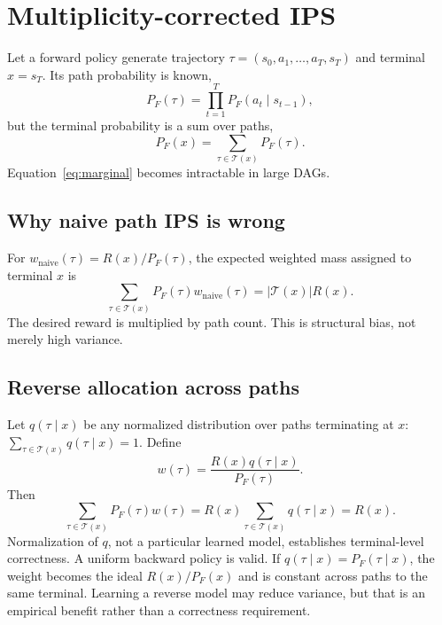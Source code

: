 \documentclass[11pt]{article}
\begin{document}
\section{Multiplicity-corrected IPS}

Let a forward policy generate trajectory
\(\tau=(s_0,a_1,\ldots,a_T,s_T)\) and terminal \(x=s_T\). Its path
probability is known,
\begin{equation}
 P_F(\tau)=\prod_{t=1}^{T}P_F(a_t\mid s_{t-1}),
\end{equation}
but the terminal probability is a sum over paths,
\begin{equation}
 P_F(x)=\sum_{\tau\in\mathcal T(x)}P_F(\tau).
 \label{eq:marginal}
\end{equation}
Equation~\eqref{eq:marginal} becomes intractable in large DAGs.

\subsection{Why naive path IPS is wrong}

For \(w_{\mathrm{naive}}(\tau)=R(x)/P_F(\tau)\), the expected weighted mass
assigned to terminal \(x\) is
\begin{equation}
 \sum_{\tau\in\mathcal T(x)}P_F(\tau)w_{\mathrm{naive}}(\tau)
 =|\mathcal T(x)|R(x).
\end{equation}
The desired reward is multiplied by path count. This is structural bias, not
merely high variance.

\subsection{Reverse allocation across paths}

Let \(q(\tau\mid x)\) be any normalized distribution over paths terminating
at \(x\): \(\sum_{\tau\in\mathcal T(x)}q(\tau\mid x)=1\). Define
\begin{equation}
 w(\tau)=\frac{R(x)q(\tau\mid x)}{P_F(\tau)}.
 \label{eq:mips}
\end{equation}
Then
\begin{equation}
 \sum_{\tau\in\mathcal T(x)}P_F(\tau)w(\tau)
 =R(x)\sum_{\tau\in\mathcal T(x)}q(\tau\mid x)=R(x).
 \label{eq:unbiased}
\end{equation}
Normalization of \(q\), not a particular learned model, establishes
terminal-level correctness. A uniform backward policy is valid. If
\(q(\tau\mid x)=P_F(\tau\mid x)\), the weight becomes the ideal
\(R(x)/P_F(x)\) and is constant across paths to the same terminal. Learning a
reverse model may reduce variance, but that is an empirical benefit rather
than a correctness requirement.
\end{document}
